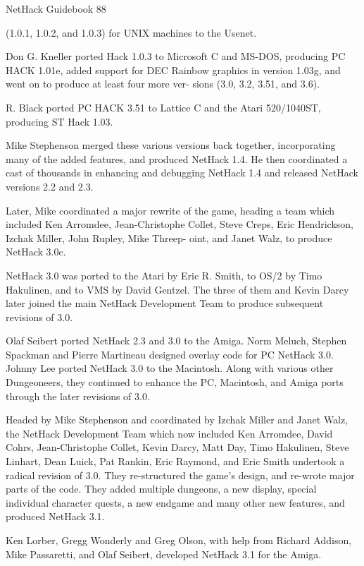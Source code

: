 \documentclass[11pt]{article}
\begin{document}
NetHack Guidebook                       88



(1.0.1, 1.0.2, and 1.0.3) for UNIX machines to the Usenet.

   Don G. Kneller ported Hack 1.0.3 to Microsoft C and MS-DOS,
producing PC HACK 1.01e, added support for DEC Rainbow graphics
in version 1.03g, and went on to produce at least four more ver-
sions (3.0, 3.2, 3.51, and 3.6).

   R. Black ported PC HACK 3.51 to Lattice C and the Atari
520/1040ST, producing ST Hack 1.03.

   Mike Stephenson merged these various versions back together,
incorporating many of the added features, and produced NetHack
1.4. He then coordinated a cast of thousands in enhancing and
debugging NetHack 1.4 and released NetHack versions 2.2 and 2.3.

   Later, Mike coordinated a major rewrite of the game, heading
a team which included Ken Arromdee, Jean-Christophe Collet, Steve
Creps, Eric Hendrickson, Izchak Miller, John Rupley, Mike Threep-
oint, and Janet Walz, to produce NetHack 3.0c.

   NetHack 3.0 was ported to the Atari by Eric R. Smith, to
OS/2 by Timo Hakulinen, and to VMS by David Gentzel. The three
of them and Kevin Darcy later joined the main NetHack Development
Team to produce subsequent revisions of 3.0.

   Olaf Seibert ported NetHack 2.3 and 3.0 to the Amiga. Norm
Meluch, Stephen Spackman and Pierre Martineau designed overlay
code for PC NetHack 3.0. Johnny Lee ported NetHack 3.0 to the
Macintosh. Along with various other Dungeoneers, they continued
to enhance the PC, Macintosh, and Amiga ports through the later
revisions of 3.0.

   Headed by Mike Stephenson and coordinated by Izchak Miller
and Janet Walz, the NetHack Development Team which now included
Ken Arromdee, David Cohrs, Jean-Christophe Collet, Kevin Darcy,
Matt Day, Timo Hakulinen, Steve Linhart, Dean Luick, Pat Rankin,
Eric Raymond, and Eric Smith undertook a radical revision of 3.0.
They re-structured the game's design, and re-wrote major parts of
the code. They added multiple dungeons, a new display, special
individual character quests, a new endgame and many other new
features, and produced NetHack 3.1.

   Ken Lorber, Gregg Wonderly and Greg Olson, with help from
Richard Addison, Mike Passaretti, and Olaf Seibert, developed
NetHack 3.1 for the Amiga.
\end{document}
